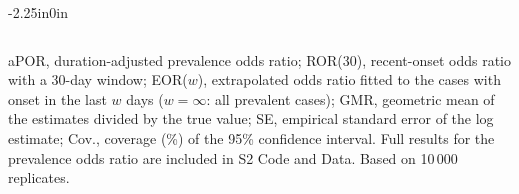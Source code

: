 \begin{table}[!htbp]
\begin{adjustwidth}{-2.25in}{0in}
\begin{threeparttable}
\begin{tabular}{@{}lrcccccccccccc@{}}
\bottomrule
\end{tabular}
\begin{tablenotes}\footnotesize
\item aPOR, duration-adjusted prevalence odds ratio; ROR(30), recent-onset odds ratio with a 30-day window; EOR($w$), extrapolated odds ratio fitted to the cases with onset in the last $w$ days ($w=\infty$: all prevalent cases); GMR, geometric mean of the estimates divided by the true value; SE, empirical standard error of the log estimate; Cov., coverage (\%) of the 95\% confidence interval. Full results for the prevalence odds ratio are included in S2 Code and Data. Based on 10\,000 replicates.
\end{tablenotes}
\end{threeparttable}
\end{adjustwidth}
\end{table}
